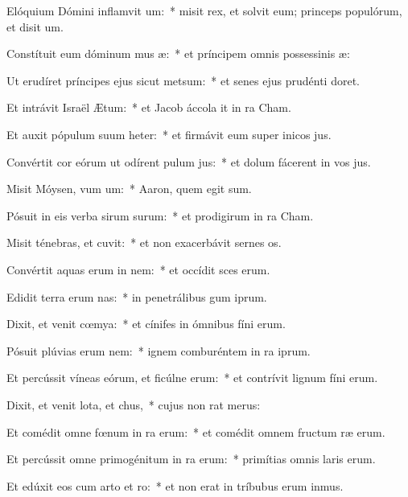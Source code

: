 \item Elóquium Dómini inflamvit um:~* misit rex, et solvit eum; princeps populórum, et disit um.
\item Constítuit eum dóminum mus æ:~* et príncipem omnis possessinis æ:
\item Ut erudíret príncipes ejus sicut metsum:~* et senes ejus prudénti doret.
\item Et intrávit Israël  Ætum:~* et Jacob áccola it in ra Cham.
\item Et auxit pópulum suum heter:~* et firmávit eum super inicos jus.
\item Convértit cor eórum ut odírent pulum jus:~* et dolum fácerent in vos jus.
\item Misit Móysen, vum um:~* Aaron, quem egit sum.
\item Pósuit in eis verba sirum surum:~* et prodigirum in ra Cham.
\item Misit ténebras, et cuvit:~* et non exacerbávit sernes os.
\item Convértit aquas erum in nem:~* et occídit sces erum.
\item Edidit terra erum nas:~* in penetrálibus gum iprum.
\item Dixit, et venit cœmya:~* et cínifes in ómnibus fíni erum.
\item Pósuit plúvias erum nem:~* ignem comburéntem in ra iprum.
\item Et percússit víneas eórum, et ficúlne erum:~* et contrívit lignum fíni erum.
\item Dixit, et venit lota, et chus,~* cujus non rat merus:
\item Et comédit omne fœnum in ra erum:~* et comédit omnem fructum ræ erum.
\item Et percússit omne primogénitum in ra erum:~* primítias omnis laris erum.
\item Et edúxit eos cum arto et ro:~* et non erat in tríbubus erum inmus.
